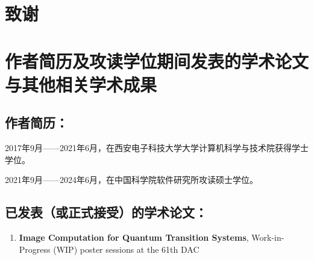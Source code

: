 \chapter[致谢]{致\quad 谢}%


\chapter{作者简历及攻读学位期间发表的学术论文与其他相关学术成果}

\section*{作者简历：}
2017年9月——2021年6月，在西安电子科技大学大学计算机科学与技术院获得学士学位。


2021年9月——2024年6月，在中国科学院软件研究所攻读硕士学位。


\section*{已发表（或正式接受）的学术论文：}

{
\setlist[enumerate]{}%
\begin{enumerate}[nosep]
    \item \textbf{Image Computation for Quantum Transition Systems},  Work-in-Progress (WIP) poster sessions at the 61th DAC
\end{enumerate}
}





\cleardoublepage[plain]%

